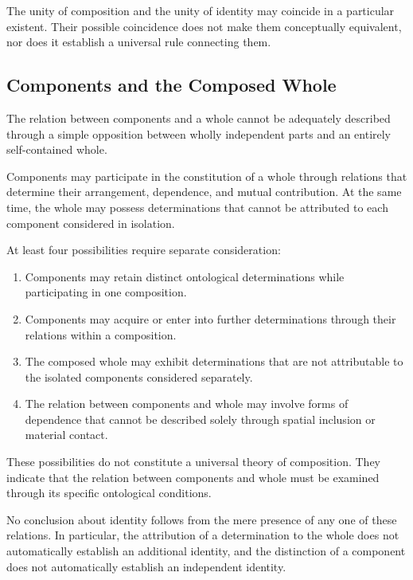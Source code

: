 The unity of composition and the unity of identity may
coincide in a particular existent. Their possible
coincidence does not make them conceptually equivalent,
nor does it establish a universal rule connecting them.

\subsection{Components and the Composed Whole}

The relation between components and a whole cannot
be adequately described through a simple opposition
between wholly independent parts and an entirely
self-contained whole.

Components may participate in the constitution of a
whole through relations that determine their arrangement,
dependence, and mutual contribution. At the same time,
the whole may possess determinations that cannot be
attributed to each component considered in isolation.

At least four possibilities require separate consideration:

\begin{enumerate}
    \item Components may retain distinct ontological
    determinations while participating in one composition.

    \item Components may acquire or enter into further
    determinations through their relations within
    a composition.

    \item The composed whole may exhibit determinations
    that are not attributable to the isolated components
    considered separately.

    \item The relation between components and whole may
    involve forms of dependence that cannot be described
    solely through spatial inclusion or material contact.
\end{enumerate}

These possibilities do not constitute a universal theory
of composition. They indicate that the relation between
components and whole must be examined through its
specific ontological conditions.

No conclusion about identity follows from the mere
presence of any one of these relations. In particular,
the attribution of a determination to the whole does
not automatically establish an additional identity,
and the distinction of a component does not automatically
establish an independent identity.

